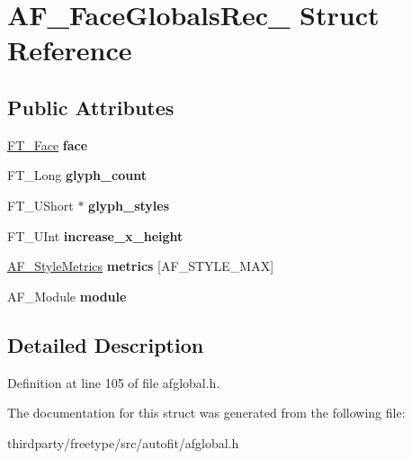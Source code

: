 \hypertarget{struct_a_f___face_globals_rec__}{}\section{A\+F\+\_\+\+Face\+Globals\+Rec\+\_\+ Struct Reference}
\label{struct_a_f___face_globals_rec__}
\subsection*{Public Attributes}
\begin{DoxyCompactItemize}
\item 
\mbox{\label{struct_a_f___face_globals_rec___afc6df352a8aa039ea4d6005b66b744d1}} 
\hyperlink{struct_f_t___face_rec__}{F\+T\+\_\+\+Face} {\bfseries face}
\item 
\mbox{\label{struct_a_f___face_globals_rec___a32603e7533538fb29a0077877b6bfaa5}} 
F\+T\+\_\+\+Long {\bfseries glyph\+\_\+count}
\item 
\mbox{\label{struct_a_f___face_globals_rec___a12528409e7c2c494f735e1c305b5b0a2}} 
F\+T\+\_\+\+U\+Short $\ast$ {\bfseries glyph\+\_\+styles}
\item 
\mbox{\label{struct_a_f___face_globals_rec___aadf2297c47963902c951b357ae380a96}} 
F\+T\+\_\+\+U\+Int {\bfseries increase\+\_\+x\+\_\+height}
\item 
\mbox{\label{struct_a_f___face_globals_rec___a9831112f175822cacf54f8666e6aeaec}} 
\hyperlink{struct_a_f___style_metrics_rec__}{A\+F\+\_\+\+Style\+Metrics} {\bfseries metrics} \mbox{[}A\+F\+\_\+\+S\+T\+Y\+L\+E\+\_\+\+M\+AX\mbox{]}
\item 
\mbox{\label{struct_a_f___face_globals_rec___a30887578f18b663c4dfa0309221a8043}} 
A\+F\+\_\+\+Module {\bfseries module}
\end{DoxyCompactItemize}


\subsection{Detailed Description}


Definition at line 105 of file afglobal.\+h.



The documentation for this struct was generated from the following file\+:\begin{DoxyCompactItemize}
\item 
thirdparty/freetype/src/autofit/afglobal.\+h\end{DoxyCompactItemize}

